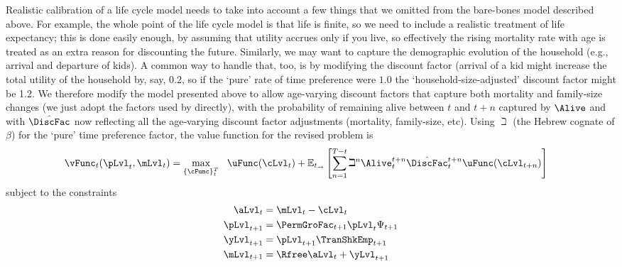 \documentclass[titlepage, headings=optiontotocandhead]{Resources/texmf-local/tex/latex/econtex}
\begin{document}
Realistic calibration of a life cycle model needs to take into account a few things that we omitted from the bare-bones model described above. For example, the whole point of the life cycle model is that life is finite, so we need to include a realistic treatment of life expectancy; this is done easily enough, by assuming that utility accrues only if you live, so effectively the rising mortality rate with age is treated as an extra reason for discounting the future.  Similarly, we may want to capture the demographic evolution of the household (e.g., arrival and departure of kids).  A common way to handle that, too, is by modifying the discount factor (arrival of a kid might increase the total utility of the household by, say, 0.2, so if the `pure' rate of time preference were $1.0$ the `household-size-adjusted' discount factor might be 1.2.  We therefore modify the model presented above to allow age-varying discount factors that capture both mortality and family-size changes (we just adopt the factors used by \cite{cagettiWprofiles} directly), with the probability of remaining alive between $t$ and $t+n$ captured by $\Alive$ and with $\hat{\DiscFac}$ now reflecting all the age-varying discount factor adjustments (mortality, family-size, etc).  Using $\beth$ (the Hebrew cognate of $\beta$) for the `pure' time preference factor, the value function for the revised problem is
  \begin{equation}\begin{gathered}\begin{aligned}
        \vFunc_{t}(\pLvl_{t},\mLvl_{t}) & =    \max_{\{\cFunc\}_{t}^{T}}~~ \uFunc(\cLvl_{t})+\Ex_{t_\rightarrow}\left[\sum_{n=1}^{T-t} {\beth}^{n} \Alive_{t}^{t+n}\hat{\DiscFac}_{t}^{t+n} \uFunc(\cLvl_{t+n}) \right]   \label{eq:lifecyclemax}
      \end{aligned}\end{gathered}  \end{equation}
subject to the constraints
  \begin{equation*}\begin{gathered}\begin{aligned}
        \aLvl_{t}  & = \mLvl_{t}-\cLvl_{t}
        \\      \pLvl_{t+1}  & = \PermGroFac_{t+1}\pLvl_{t}\Psi_{t+1}
        \\      \yLvl_{t+1}  & = \pLvl_{t+1}\TranShkEmp _{t+1}
        \\      \mLvl_{t+1}  & = \Rfree \aLvl_{t}+\yLvl_{t+1}
      \end{aligned}\end{gathered}\end{equation*}
\end{document}
